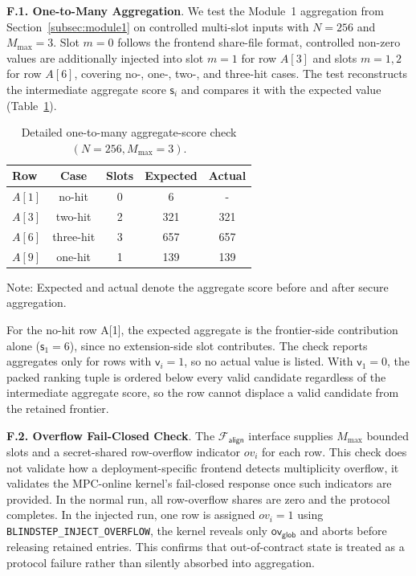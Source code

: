 \documentclass[conference,compsoc,letterpaper]{IEEEtran}
\theoremstyle{definition}
\theoremstyle{remark}
\newcommand{\myparagraph}[1]{\noindent \textbf{#1}.}
\newcommand{\Falign}{\mathcal{F}_{\mathsf{align}}}
\newcommand{\Mmax}{M_{\max}}
\newcommand{\valid}{\mathsf{v}}
\newcommand{\score}{\mathsf{s}}
\newcommand{\globaloverflow}{\mathsf{ov}_{\mathsf{glob}}}
\begin{document}
\myparagraph{F.1. One-to-Many Aggregation}
\label{app:correctness:onetomany}
We test the Module~1 aggregation from Section~\ref{subsec:module1} on controlled multi-slot inputs with \(N=256\) and \(\Mmax=3\). Slot \(m=0\) follows the frontend share-file format, controlled non-zero values are additionally injected into slot \(m=1\) for row \(A[3]\) and
slots \(m=1,2\) for row \(A[6]\), covering no-, one-, two-, and three-hit cases. The test reconstructs the intermediate aggregate score \(\score_i\) and compares it with the expected value (Table~\ref{tab:app_onetomany}).
\begin{table}[!ht]
\centering
\small
\caption{Detailed one-to-many aggregate-score check
$(N=256,\Mmax=3)$.}
\label{tab:app_onetomany}
\begin{tabular}{@{}lccc c@{}}
\toprule
\textbf{Row} & \textbf{Case} & \textbf{Slots} &
\textbf{Expected} & \textbf{Actual} \\
\midrule
$A[1]$ & no-hit    & 0 & 6   & -   \\
$A[3]$ & two-hit   & 2 & 321 & 321 \\
$A[6]$ & three-hit & 3 & 657 & 657 \\
$A[9]$ & one-hit   & 1 & 139 & 139 \\
\bottomrule
\end{tabular}
\vspace{0.3mm}
\begin{flushleft}
\footnotesize
Note: Expected and actual denote the aggregate score before and after secure aggregation.
\end{flushleft}
\vspace{-3mm}
\end{table}
For the no-hit row A[1], the expected aggregate is the frontier-side contribution alone ($\score_1 = 6$), since no extension-side slot contributes.
The check reports aggregates only for rows with $\valid_i = 1$, so no actual value is listed. With $\valid_1 = 0$, the packed ranking tuple is ordered below every valid candidate regardless of the intermediate aggregate score, so the row cannot displace a valid candidate from the retained frontier.

\myparagraph{F.2. Overflow Fail-Closed Check}
\label{app:correctness:overflow}
The \(\Falign{}\) interface supplies \(M_{\max}\) bounded slots and a secret-shared row-overflow indicator \(ov_i\) for each row. This check does not validate how a deployment-specific frontend detects multiplicity overflow, it validates the MPC-online kernel's fail-closed response once such indicators are provided. In the normal run, all row-overflow shares are zero and the protocol completes. In the injected run, one row is assigned \(ov_i=1\) using \texttt{BLINDSTEP\_INJECT\_OVERFLOW}, the kernel reveals only \(\globaloverflow\) and aborts before releasing retained entries. This confirms that out-of-contract state is treated as a protocol failure rather than silently absorbed into aggregation.
\end{document}
